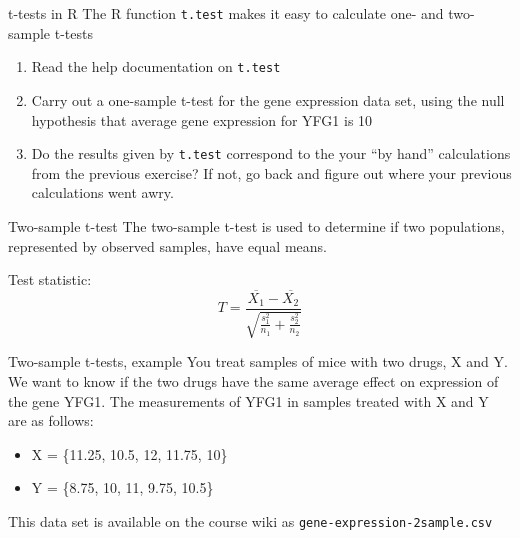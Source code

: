 \documentclass[presentation]{beamer}
\begin{document}
\begin{frame}[fragile,label={sec:orgabef869}]{t-tests in R}
 The R function \texttt{t.test} makes it easy to calculate one- and two-sample t-tests

\begin{enumerate}
\item Read the help documentation on \texttt{t.test}
\item Carry out a one-sample t-test for the gene expression data set, using the null hypothesis that average gene expression for YFG1 is 10
\item Do the results given by \texttt{t.test} correspond to the your ``by hand'' calculations from the previous exercise?  If not, go back and figure out where your previous calculations went awry.
\end{enumerate}
\end{frame}


\begin{frame}[label={sec:org33bcefb}]{Two-sample t-test}
The two-sample t-test is used to determine if two populations, represented by observed samples, have equal means.


Test statistic:
\[
T = \frac{\overline{X_1} - \overline{X_2}}{\sqrt{\frac{s_1^2}{n_1} + \frac{s_2^2}{n_2}}} 
\]
\end{frame}


\begin{frame}[fragile,label={sec:orga5f968a}]{Two-sample t-tests, example}
 You treat samples of mice with two drugs, X and Y.  We want to know if the two drugs have the same average effect on expression of the gene YFG1. The measurements of YFG1 in samples treated with X and Y are as follows: 


\begin{itemize}
\item X = \{11.25, 10.5, 12, 11.75, 10\}
\item Y = \{8.75, 10, 11, 9.75, 10.5\}
\end{itemize}

This data set is available on the course wiki as \texttt{gene-expression-2sample.csv}
\end{frame}
\end{document}
